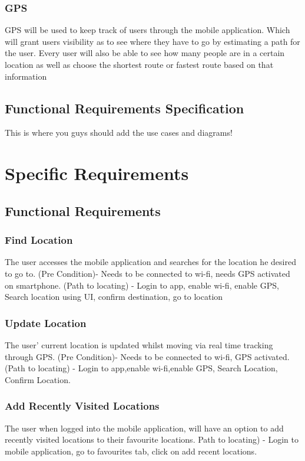 \documentclass{article}
\begin{document}
\subsubsection{GPS}
GPS will be used to keep track of users through the mobile application. Which will grant users visibility as to see where they have to go by estimating a path for the user. Every user will also be able to see how many people are in a certain location as well as choose the shortest route or fastest route based on that information
\subsection {Functional Requirements Specification}
This is where you guys should add the use cases and diagrams!
\newpage
\centering
\section{Specific Requirements}
\subsection{Functional Requirements}
\subsubsection{Find Location}
The user accesses the mobile application and searches for the location he desired to go to. (Pre Condition)- Needs to be connected to wi-fi, needs GPS activated on smartphone. (Path to locating) - Login to app, enable wi-fi, enable GPS, Search location using UI, confirm destination, go to location

\subsubsection{Update Location}
The user' current location is updated whilst moving via real time tracking through GPS. (Pre Condition)- Needs to be connected to wi-fi, GPS activated. (Path to locating) - Login to app,enable wi-fi,enable GPS, Search Location, Confirm Location.

\subsubsection{Add Recently Visited Locations}
The user when logged into the mobile application, will have an option to add recently visited locations to their favourite locations. Path to locating) - Login to mobile application, go to favourites tab, click on add recent locations.
\end{document}
